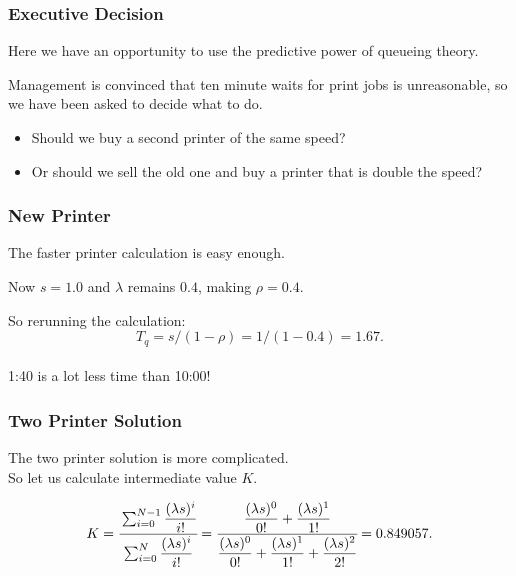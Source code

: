 \begin{frame}
\frametitle{Executive Decision}

\large
\begin{changemargin}{1.5cm}
Here we have an opportunity to use the predictive power of queueing theory. 

Management is convinced that ten minute waits for print jobs is unreasonable, so we have been asked to decide what to do. 

\begin{itemize}
\item Should we buy a second printer of the same speed?
\item Or should we sell the old one and buy a printer that is double the speed?
\end{itemize}
\end{changemargin}

\end{frame}



\begin{frame}
\frametitle{New Printer}

\large
\begin{changemargin}{1.5cm}
The faster printer calculation is easy enough. 

Now $s = 1.0$ and $\lambda$ remains $0.4$, making $\rho = 0.4$. 

So rerunning the calculation: 
\[ T_{q} = s / (1 - \rho ) = 1 / (1 - 0.4 ) = 1.67.\]
~\\[0em]

1:40 is a lot less time than 10:00! 
\end{changemargin}

\end{frame}



\begin{frame}
\frametitle{Two Printer Solution}

\large
\begin{changemargin}{1.5cm}
The two printer solution is more complicated. \\
So let us calculate intermediate value $K$.

	\[ K = \cfrac{\sum_{i=0}^{N-1}\dfrac{(\lambda s)^{i}}{i!}}{{\sum_{i=0}^{N}\dfrac{(\lambda s)^{i}}{i!}}} = \cfrac{\dfrac{(\lambda s)^{0}}{0!} + \dfrac{(\lambda s)^{1}}{1!}}{\dfrac{(\lambda s)^{0}}{0!} + \dfrac{(\lambda s)^{1}}{1!} + \dfrac{(\lambda s)^{2}}{2!}} = 0.849057.
\]
	
\end{changemargin}
\end{frame}



